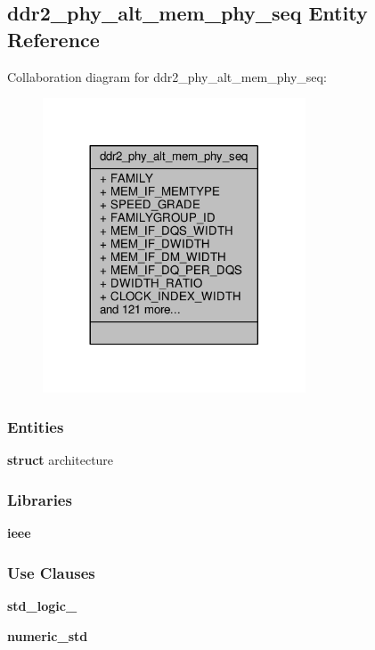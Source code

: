 \subsection{ddr2\+\_\+phy\+\_\+alt\+\_\+mem\+\_\+phy\+\_\+seq Entity Reference}
\label{classddr2__phy__alt__mem__phy__seq}


Collaboration diagram for ddr2\+\_\+phy\+\_\+alt\+\_\+mem\+\_\+phy\+\_\+seq\+:\nopagebreak
\begin{figure}[H]
\begin{center}
\leavevmode
\includegraphics[width=221pt]{d0/d2b/classddr2__phy__alt__mem__phy__seq__coll__graph}
\end{center}
\end{figure}
\subsubsection*{Entities}
\begin{DoxyCompactItemize}
\item 
{\bf struct} architecture
\end{DoxyCompactItemize}
\subsubsection*{Libraries}
 \begin{DoxyCompactItemize}
\item 
{\bf ieee} 
\end{DoxyCompactItemize}
\subsubsection*{Use Clauses}
 \begin{DoxyCompactItemize}
\item 
{\bf std\+\_\+logic\+\_}   
\item 
{\bf numeric\+\_\+std}   
\end{DoxyCompactItemize}
